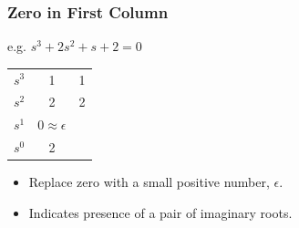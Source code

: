 \documentclass[a4paper]{article}
\begin{document}
\subsubsection{Zero in First Column}
e.g. $s^3+2s^2+s+2=0$\\
\begin{minipage}{0.2\textwidth}
\begin{table}[H]
\begin{tabular}{ccc}
$s^3$ & 1                  & 1 \\
$s^2$ & 2                  & 2 \\
$s^1$ & $0\approx\epsilon$ &   \\
$s^0$ & 2                  &  
\end{tabular}
\end{table}
\end{minipage}
\begin{minipage}{0.8\textwidth}
\begin{itemize}
    \item Replace zero with a small positive number, $\epsilon$.
    \item Indicates presence of a pair of imaginary roots.
\end{itemize}
\end{minipage}
\end{document}
